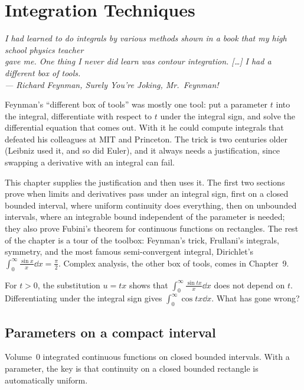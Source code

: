 \chapter{Integration Techniques}

\begin{center}\itshape
I had learned to do integrals by various methods shown in a book that my high school physics teacher\\
gave me. One thing I never did learn was contour integration. [\dots] I had a different box of tools.\\
\upshape --- Richard Feynman, \emph{Surely You're Joking, Mr.~Feynman!}
\end{center}

Feynman's ``different box of tools'' was mostly one tool: put a parameter $t$ into the integral, differentiate with
respect to $t$ under the integral sign, and solve the differential equation that comes out. With it he could compute
integrals that defeated his colleagues at MIT and Princeton. The trick is two centuries older (Leibniz used it, and so
did Euler), and it always needs a justification, since swapping a derivative with an integral can fail.

This chapter supplies the justification and then uses it. The first two sections prove when limits and derivatives
pass under an integral sign, first on a closed bounded interval, where uniform continuity does everything, then on
unbounded intervals, where an integrable bound independent of the parameter is needed; they also prove Fubini's
theorem for continuous functions on rectangles. The rest of the chapter is a tour of the toolbox: Feynman's trick,
Frullani's integrals, symmetry, and the most famous semi-convergent integral, Dirichlet's
$\int_0^\infty\frac{\sin x}x\dd x=\frac\pi2$. Complex analysis, the other box of tools, comes in Chapter~9.

\begin{think}
For $t>0$, the substitution $u=tx$ shows that $\int_0^\infty\frac{\sin tx}x\dd x$ does not depend on $t$. Differentiating
under the integral sign gives $\int_0^\infty\cos tx\dd x$. What has gone wrong?
\end{think}

\section{Parameters on a compact interval}

Volume~0 integrated continuous functions on closed bounded intervals. With a parameter, the key is that continuity on a
closed bounded rectangle is automatically uniform.

